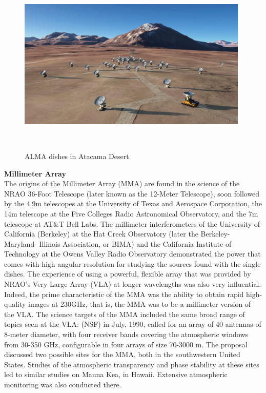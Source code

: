 \begin{figure}
\centering
\includegraphics[width=11cm,height=8cm]{images/alma.jpg}\\
\caption{ALMA dishes in Atacama Desert}
\end{figure}


\textbf{Millimeter Array} \\

The origins of the Millimeter Array (MMA) are found in the science of the NRAO 36-Foot Telescope (later known as the 12-Meter Telescope), soon followed by the 4.9m telescopes at the University of Texas and Aerospace Corporation, the 14m telescope at the Five Colleges Radio Astronomical Observatory, and the 7m telescope at AT\&T Bell Labs. The millimeter interferometers of the University of California (Berkeley) at the Hat Creek Observatory (later the Berkeley-Maryland- Illinois Association, or BIMA) and the California Institute of Technology at the Owens Valley Radio Observatory demonstrated the power that comes with high angular resolution for studying the sources found with the single dishes. The experience of using a powerful, flexible array that was provided by NRAO’s Very Large Array (VLA) at longer wavelengths was also very influential. Indeed, the prime characteristic of the MMA was the ability to obtain rapid high-quality images at 230GHz, that is, the MMA was to be a millimeter version of the VLA. The science targets of the MMA included the same broad range of topics seen at the VLA: (NSF) in July, 1990, called for an array of 40 antennas of 8-meter diameter, with four receiver bands covering the atmospheric windows from 30-350 GHz, configurable in four arrays of size 70-3000 m. The proposal discussed two possible sites for the MMA, both in the southwestern United States. Studies of the atmospheric transparency and phase stability at these sites led to similar studies on Mauna Kea, in Hawaii. Extensive atmospheric monitoring was also conducted there.\\



